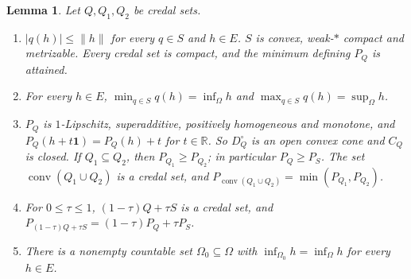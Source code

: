 \documentclass[11pt]{article}
\newtheorem{lemma}[theorem]{Lemma}
\theoremstyle{definition}
\newcommand{\R}{\mathbb R}
\newcommand{\one}{\mathbf 1}
\DeclareMathOperator{\conv}{conv}
\begin{document}
\begin{lemma}\label{lem:states}
Let $Q,Q_1,Q_2$ be credal sets.
\begin{enumerate}[label=(\alph*)]
\item $|q(h)|\le\|h\|$ for every $q\in S$ and $h\in E$. $S$ is convex, weak-$\ast$ compact and metrizable. Every credal set is compact, and the minimum defining $P_Q$ is attained.
\item For every $h\in E$, $\min_{q\in S}q(h)=\inf_\Omega h$ and $\max_{q\in S}q(h)=\sup_\Omega h$.
\item $P_Q$ is $1$-Lipschitz, superadditive, positively homogeneous and monotone, and $P_Q(h+t\one)=P_Q(h)+t$ for $t\in\R$. So $D^\circ_Q$ is an open convex cone and $C_Q$ is closed. If $Q_1\subseteq Q_2$, then $P_{Q_1}\ge P_{Q_2}$; in particular $P_Q\ge P_S$. The set $\conv(Q_1\cup Q_2)$ is a credal set, and $P_{\conv(Q_1\cup Q_2)}=\min(P_{Q_1},P_{Q_2})$.
\item For $0\le\tau\le1$, $(1-\tau)Q+\tau S$ is a credal set, and $P_{(1-\tau)Q+\tau S}=(1-\tau)P_Q+\tau P_S$.
\item There is a nonempty countable set $\Omega_0\subseteq\Omega$ with $\inf_{\Omega_0}h=\inf_\Omega h$ for every $h\in E$.
\end{enumerate}
\end{lemma}
\end{document}
